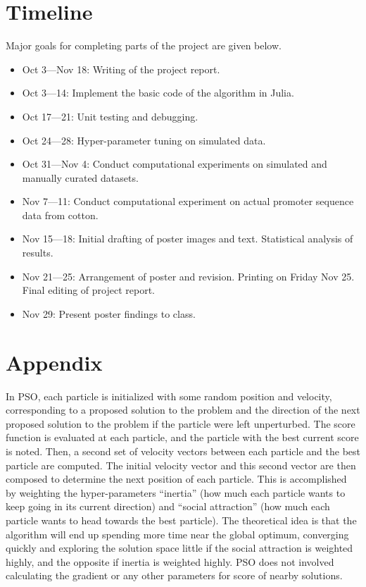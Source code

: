 \documentclass{article}
\begin{document}
\section{Timeline}
Major goals for completing parts of the project are given below. 
\begin{itemize}
	\item Oct  3---Nov 18: Writing of the project report.
	\item Oct  3---14: Implement the basic code of the algorithm in Julia.
	\item Oct 17---21: Unit testing and debugging.
	\item Oct 24---28: Hyper-parameter tuning on simulated data.
	\item Oct 31---Nov 4: Conduct computational experiments on simulated and manually curated datasets.
	\item Nov 7---11: Conduct computational experiment on actual promoter sequence data from cotton.
	\item Nov 15---18: Initial drafting of poster images and text. Statistical analysis of results.
	\item Nov 21---25: Arrangement of poster and revision. Printing on Friday Nov 25. Final editing of project report.
	\item Nov 29: Present poster findings to class.
\end{itemize}
\pagebreak
\section{Appendix}
In PSO, each particle is initialized with some random position and velocity, corresponding to a proposed solution to the problem and the direction of the next proposed solution to the problem if the particle were left unperturbed. The score function is evaluated at each particle, and the particle with the best current score is noted. Then, a second set of velocity vectors between each particle and the best particle are computed. The initial velocity vector and this second vector are then composed to determine the next position of each particle. This is accomplished by weighting the hyper-parameters ``inertia'' (how much each particle wants to keep going in its current direction) and ``social attraction'' (how much each particle wants to head towards the best particle). The theoretical idea is that the algorithm will end up spending more time near the global optimum, converging quickly and exploring the solution space little if the social attraction is weighted highly, and the opposite if inertia is weighted highly. PSO does not involved calculating the gradient or any other parameters for score of nearby solutions.
  
\end{document}
